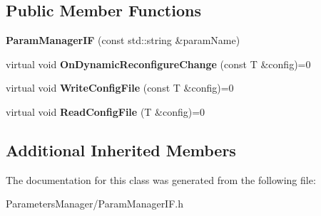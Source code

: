 \subsection*{Public Member Functions}
\begin{DoxyCompactItemize}
\item 
\mbox{\label{classproc__control_1_1_param_manager_i_f_aaa30f9f70b14c3341b3ff597cdda4726}} 
{\bfseries Param\+Manager\+IF} (const std\+::string \&param\+Name)
\item 
\mbox{\label{classproc__control_1_1_param_manager_i_f_a45bc4d1c2312f1a49daae4cdc6ca7d6d}} 
virtual void {\bfseries On\+Dynamic\+Reconfigure\+Change} (const T \&config)=0
\item 
\mbox{\label{classproc__control_1_1_param_manager_i_f_a84dd599146e16a8595b1e7a3d22b05d9}} 
virtual void {\bfseries Write\+Config\+File} (const T \&config)=0
\item 
\mbox{\label{classproc__control_1_1_param_manager_i_f_a79139c3be12afdff3ab3fa46eea00bbd}} 
virtual void {\bfseries Read\+Config\+File} (T \&config)=0
\end{DoxyCompactItemize}
\subsection*{Additional Inherited Members}


The documentation for this class was generated from the following file\+:\begin{DoxyCompactItemize}
\item 
Parameters\+Manager/Param\+Manager\+I\+F.\+h\end{DoxyCompactItemize}
